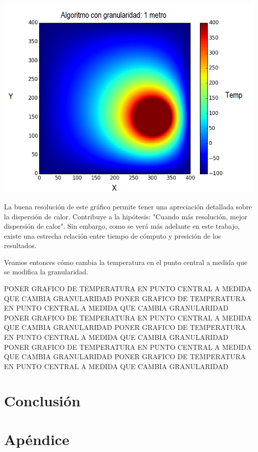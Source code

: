 	\begin{center}
		\includegraphics[width=\textwidth]{./img/granularidad/g1_t400_sinkill.png}
	\end{center}

	La buena resolución de este gráfico permite tener una apreciación detallada sobre la dispersión de calor. Contribuye a la hipótesis: "Cuando más resolución, mejor dispersión de calor". Sin embargo, como se verá más adelante en este trabajo, existe una estrecha relación entre tiempo de cómputo y presición de los resultados. 

	Veamos entonces cómo cambia la temperatura en el punto central a medida que se modifica la granularidad.


	PONER GRAFICO DE TEMPERATURA EN PUNTO CENTRAL A MEDIDA QUE CAMBIA GRANULARIDAD
	PONER GRAFICO DE TEMPERATURA EN PUNTO CENTRAL A MEDIDA QUE CAMBIA GRANULARIDAD
	PONER GRAFICO DE TEMPERATURA EN PUNTO CENTRAL A MEDIDA QUE CAMBIA GRANULARIDAD
	PONER GRAFICO DE TEMPERATURA EN PUNTO CENTRAL A MEDIDA QUE CAMBIA GRANULARIDAD
	PONER GRAFICO DE TEMPERATURA EN PUNTO CENTRAL A MEDIDA QUE CAMBIA GRANULARIDAD	PONER GRAFICO DE TEMPERATURA EN PUNTO CENTRAL A MEDIDA QUE CAMBIA GRANULARIDAD

\section{Conclusión}

\section{Apéndice}

